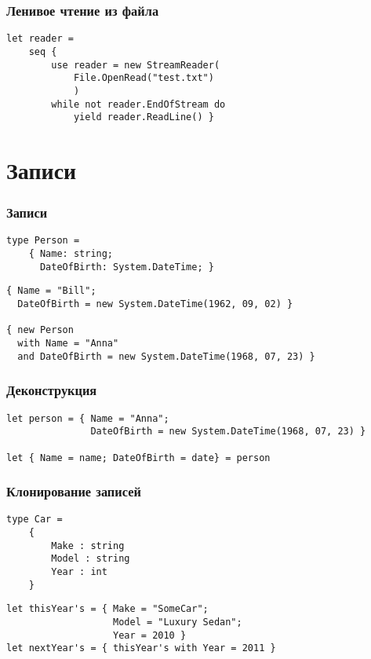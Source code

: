 \documentclass[xetex,mathserif,serif]{beamer}
\begin{document}
	\begin{frame}[fragile]
		\frametitle{Ленивое чтение из файла}
		\begin{verbatim}
let reader =
    seq { 
        use reader = new StreamReader(
            File.OpenRead("test.txt")
            )
        while not reader.EndOfStream do
            yield reader.ReadLine() }
		\end{verbatim}
	\end{frame}

	\section{Записи}
	
	\begin{frame}[fragile]
		\frametitle{Записи}
		\begin{verbatim}
type Person =
    { Name: string;
      DateOfBirth: System.DateTime; }
		\end{verbatim}

		\begin{verbatim}
{ Name = "Bill"; 
  DateOfBirth = new System.DateTime(1962, 09, 02) }

{ new Person
  with Name = "Anna"
  and DateOfBirth = new System.DateTime(1968, 07, 23) }
		\end{verbatim}
	\end{frame}

	\begin{frame}[fragile]
		\frametitle{Деконструкция}
		\begin{verbatim}
let person = { Name = "Anna"; 
               DateOfBirth = new System.DateTime(1968, 07, 23) }

let { Name = name; DateOfBirth = date} = person
		\end{verbatim}
	\end{frame}

	\begin{frame}[fragile]
		\frametitle{Клонирование записей}
		\begin{verbatim}
type Car =
    {
        Make : string
        Model : string
        Year : int
    }
		\end{verbatim}
		
		\begin{verbatim}
let thisYear's = { Make = "SomeCar"; 
                   Model = "Luxury Sedan"; 
                   Year = 2010 }
let nextYear's = { thisYear's with Year = 2011 }
		\end{verbatim}
	\end{frame}
\end{document}
